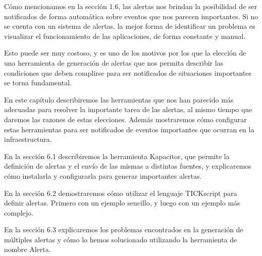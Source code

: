 Cómo mencionamos en la sección 1.6, las alertas nos brindan la posibilidad de ser notificados de forma automática sobre eventos que nos parecen importantes. Si no se cuenta con un sistema de alertas, la mejor forma de identificar un problema es visualizar el funcionamiento de las aplicaciones, de forma constante y manual.

Esto puede ser muy costoso, y es uno de los motivos por los que la elección de una herramienta de generación de alertas que nos permita describir las condiciones que deben complirse para ser notificados de situaciones importantes se torna fundamental.

En este capítulo describiremos las herramientas que nos han parecido más adecuadas para resolver la importante tarea de las alertas, al mismo tiempo que daremos las razones de estas elecciones. Además mostraremos cómo configurar estas herramientas para ser notificados de eventos importantes que ocurran en la infraestructura.

En la sección 6.1 describiremos la herramienta Kapacitor, que permite la definición de alertas y el envío de las mismas a distintas fuentes, y explicaremos cómo instalarla y configurarla para generar importantes alertas.

En la sección 6.2 demostraremos cómo utilizar el lenguaje TICKscript para definir alertas. Primero con un ejemplo sencillo, y luego con un ejemplo más complejo.

En la sección 6.3 explicaremos los problemas encontrados en la generación de múltiples alertas y cómo lo hemos solucionado utilizando la herramienta de nombre Alerta.
